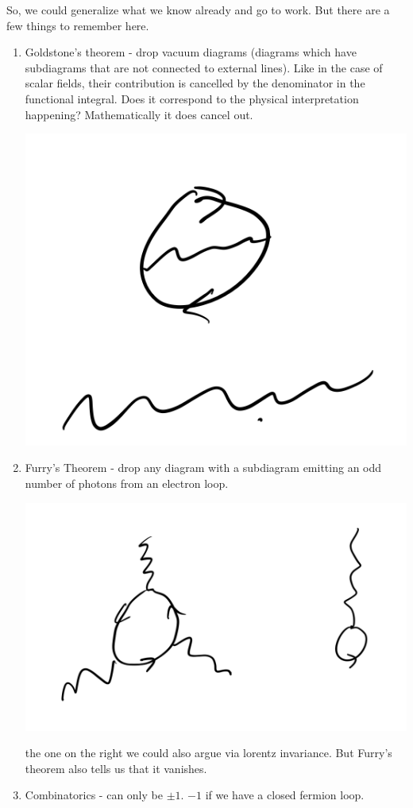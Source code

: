 So, we could generalize what we know already and go to work. But there are a few things to remember here.
\begin{enumerate}
    \item Goldstone's theorem - drop vacuum diagrams (diagrams which have subdiagrams that are not connected to external lines). Like in the case of scalar fields, their contribution is cancelled by the denominator in the functional integral. Does it correspond to the physical interpretation happening? Mathematically it does cancel out.
    \begin{center}
        \includegraphics[scale=0.5]{Images/fig-lec31p2.png}
    \end{center}
    \item Furry's Theorem - drop any diagram with a subdiagram emitting an odd number of photons from an electron loop. 
    \begin{center}
        \includegraphics[scale=0.5]{Images/fig-lec31p3.png}
    \end{center}
    the one on the right we could also argue via lorentz invariance. But Furry's theorem also tells us that it vanishes.
    \item Combinatorics - can only be $\pm 1$. $-1$ if we have a closed fermion loop. 
\end{enumerate}

